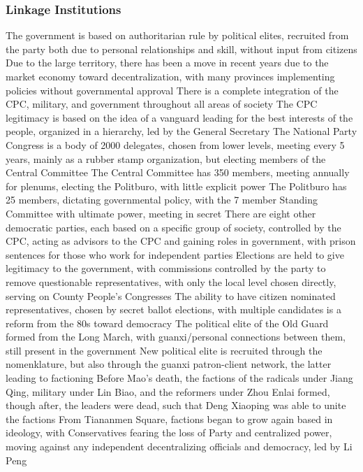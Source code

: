 \documentclass[11 pt, twoside]{article}
\newenvironment{outline*}
{
	\begin{outline}[enumerate]
	}
	{\end{outline}
}
\begin{document}
\subsubsection{Linkage Institutions}
\begin{outline*}
\1 The government is based on authoritarian rule by political elites, recruited from the party both due to personal relationships and skill, without input from citizens
\2 Due to the large territory, there has been a move in recent years due to the market economy toward decentralization, with many provinces implementing policies without governmental approval
\2 There is a complete integration of the CPC, military, and government throughout all areas of society
\1 The CPC legitimacy is based on the idea of a vanguard leading for the best interests of the people, organized in a hierarchy, led by the General Secretary
\2 The National Party Congress is a body of 2000 delegates, chosen from lower levels, meeting every 5 years, mainly as a rubber stamp organization, but electing members of the Central Committee
\2 The Central Committee has 350 members, meeting annually for plenums, electing the Politburo, with little explicit power
\2 The Politburo has 25 members, dictating governmental policy, with the 7 member Standing Committee with ultimate power, meeting in secret
\1 There are eight other democratic parties, each based on a specific group of society, controlled by the CPC, acting as advisors to the CPC and gaining roles in government, with prison sentences for those who work for independent parties
\1 Elections are held to give legitimacy to the government, with commissions controlled by the party to remove questionable representatives, with only the local level chosen directly, serving on County People's Congresses
\2 The ability to have citizen nominated representatives, chosen by secret ballot elections, with multiple candidates is a reform from the 80s toward democracy
\1 The political elite of the Old Guard formed from the Long March, with guanxi/personal connections between them, still present in the government
\2 New political elite is recruited through the nomenklature, but also through the guanxi patron-client network, the latter leading to factioning
\2 Before Mao's death, the factions of the radicals under Jiang Qing, military under Lin Biao, and the reformers under Zhou Enlai formed, though after, the leaders were dead, such that Deng Xiaoping was able to unite the factions
\2 From Tiananmen Square, factions began to grow again based in ideology, with Conservatives fearing the loss of Party and centralized power, moving against any independent decentralizing officials and democracy, led by Li Peng

\end{outline*}
\end{document}
